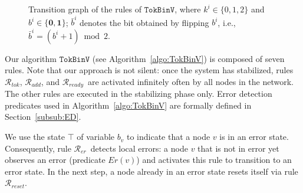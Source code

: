 \documentclass[a4paper, 12pt]{article}
\newcommand{\rk}{k}
\newcommand{\Rer}{$\mathscr{R}_{er}$}
\newcommand{\Rreset}{$\mathscr{R}_{reset}$}
\newcommand{\RerRank}{$\mathscr{R}_{erRank}$}
\newcommand{\Rtok}{$\mathscr{R}_{tok}$}
\newcommand{\Radd}{$\mathscr{R}_{add}$}
\newcommand{\Rready}{$\mathscr{R}_{ready}$}
\begin{document}
\begin{figure}[http!]
\centering
{}
\caption{Transition graph of the rules of $\mathtt{TokBinV}$, where 
$\rk^i \in \{0,1,2\}$ and $b^i \in \{\mathbf{0},\mathbf{1}\}$; 
$\bar{b}^i$ denotes the bit obtained by flipping $b^i$, 
i.e., $\bar{b}^i = (b^i + 1) \bmod 2$. }
\label{fig:transition-rules}
\end{figure}

Our algorithm $\mathtt{TokBinV}$ (see Algorithm~\ref{algo:TokBinV}) is composed of seven 
rules. Note that our approach is not silent: once the system has stabilized, rules \Rtok, 
\Radd, and \Rready\ are activated infinitely often by all nodes in the network. The other 
rules are executed in the stabilizing phase only. Error detection predicates used in 
Algorithm~\ref{algo:TokBinV} are formally defined in Section~\ref{subsub:ED}.

We use the state $\top$ of variable $b_v$ to indicate that a node $v$ is in an error 
state. Consequently, rule \Rer\ detects local errors: a node $v$ that is not in error 
yet observes an error (predicate $Er(v)$) and activates this rule to transition to an 
error state. In the next step, a node already in an error state resets itself via rule 
\Rreset.
\end{document}
